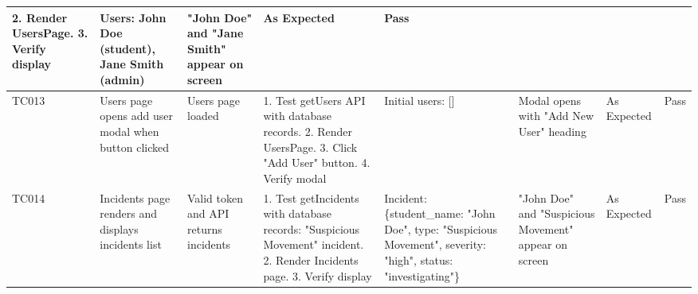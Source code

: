 \begin{table}[H]
{\begin{tabular}{|p{0.8cm}|p{1.8cm}|p{1.5cm}|p{2.5cm}|p{1.5cm}|p{2cm}|p{1.2cm}|p{0.8cm}|}
        2. Render UsersPage. 
        3. Verify display & Users: John Doe (student), Jane Smith (admin) & "John Doe" and "Jane Smith" appear on screen & As Expected & Pass \\
        \hline
        TC013 & Users page opens add user modal when button clicked & Users page loaded & 1. Test getUsers API with database records. 
        2. Render UsersPage. 
        3. Click "Add User" button. 
        4. Verify modal & Initial users: [] & Modal opens with "Add New User" heading & As Expected & Pass \\
        \hline
        TC014 & Incidents page renders and displays incidents list & Valid token and API returns incidents & 1. Test getIncidents with database records: "Suspicious Movement" incident. 
        2. Render Incidents page. 
        3. Verify display & Incident: \{student\_name: "John Doe", type: "Suspicious Movement", severity: "high", status: "investigating"\} & "John Doe" and "Suspicious Movement" appear on screen & As Expected & Pass \\
        \hline
    \end{tabular}%
    }
\end{table}
